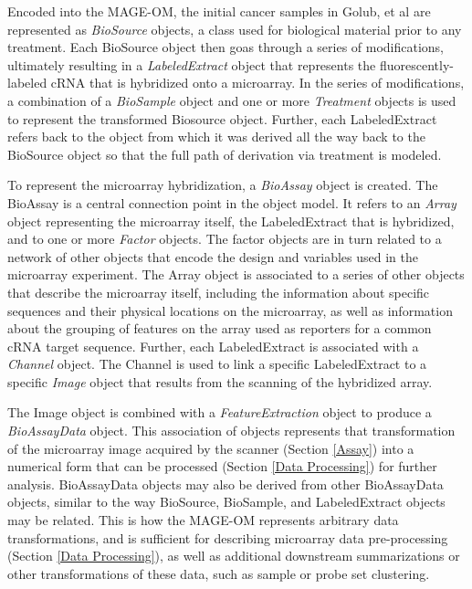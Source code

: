 Encoded into the MAGE-OM, the initial cancer samples in Golub, et al
\cite{golub} are represented as \emph{BioSource} objects, a class used for
biological material prior to any treatment.  Each BioSource object then goas
through a series of modifications, ultimately resulting in a
\emph{LabeledExtract} object that represents the fluorescently-labeled cRNA
that is hybridized onto a microarray.  In the series of modifications, a
combination of a \emph{BioSample} object and one or more \emph{Treatment}
objects is used to represent the transformed Biosource object.  Further, each
LabeledExtract refers back to the object from which it was derived all the way
back to the BioSource object so that the full path of derivation via treatment
is modeled.

To represent the microarray hybridization, a \emph{BioAssay} object is created.
The BioAssay is a central connection point in the object model.  It refers to
an \emph{Array} object representing the microarray itself, the LabeledExtract
that is hybridized, and to one or more \emph{Factor} objects.  The factor
objects are in turn related to a network of other objects that encode the
design and variables used in the microarray experiment.  The Array object is
associated to a series of other objects that describe the microarray itself,
including the information about specific sequences and their physical locations
on the microarray, as well as information about the grouping of features on the
array used as reporters for a common cRNA target sequence.  Further, each
LabeledExtract is associated with a \emph{Channel} object.  The Channel is used
to link a specific LabeledExtract to a specific \emph{Image} object that
results from the scanning of the hybridized array.

The Image object is combined with a \emph{FeatureExtraction} object to produce
a \emph{BioAssayData} object.  This association of objects represents that
transformation of the microarray image acquired by the scanner (Section
\ref{Assay}) into a numerical form that can be processed (Section \ref{Data
Processing}) for further analysis.  BioAssayData objects may also be derived
from other BioAssayData objects, similar to the way BioSource, BioSample, and
LabeledExtract objects may be related.  This is how the MAGE-OM represents
arbitrary data transformations, and is sufficient for describing microarray
data pre-processing (Section \ref{Data Processing}), as well as additional
downstream summarizations or other transformations of these data, such as
sample or probe set clustering.


